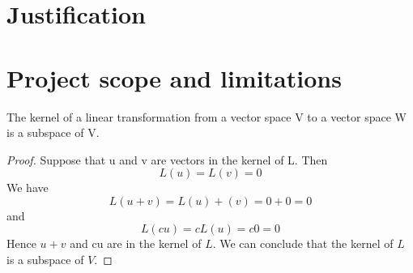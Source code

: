 \section{Justification}
\lipsum[1]

\section{Project scope and limitations}
\lipsum[1]
\begin{theorem}
The kernel of a linear transformation from a vector space V to a vector space W is a subspace of V.
\end{theorem}
\begin{proof}
    Suppose that u and v are vectors in the kernel of L.  Then 
    \begin{equation}
        L(u) = L(v) = 0
    \end{equation}
    We have
    \begin{equation}
        L(u + v) = L(u) + (v) = 0 + 0 = 0 
    \end{equation}
    and
    \begin{equation}
        L(cu) = cL(u) = c0 = 0
    \end{equation}
    Hence $u + v$ and cu are in the kernel of $L$. We can conclude that the kernel of $L$ is a subspace of $V$.
\end{proof}
\lipsum[1]

